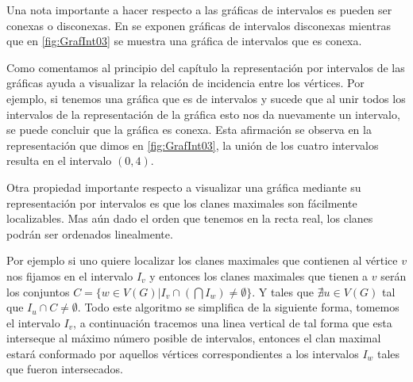 Una nota importante a hacer respecto a las gráficas de intervalos es pueden ser
conexas o disconexas. En  se exponen
gráficas de intervalos disconexas mientras que en \cref{fig:GrafInt03} se
muestra una gráfica de intervalos que es conexa. 

Como comentamos al principio del capítulo la representación por intervalos de
las gráficas ayuda a visualizar la relación de incidencia entre los vértices.
Por ejemplo, si tenemos una gráfica que es de intervalos y sucede que al unir
todos los intervalos de la representación de la gráfica esto nos da nuevamente
un intervalo, se puede concluir que la gráfica es conexa. Esta afirmación se
observa en la representación que dimos en \cref{fig:GrafInt03}, la unión de los
cuatro intervalos resulta en el intervalo $(0,4)$.

Otra propiedad importante respecto a visualizar una gráfica mediante su
representación por intervalos es que los clanes maximales son fácilmente
localizables. Mas aún dado el orden que tenemos en la recta real, los clanes
podrán ser ordenados linealmente.

Por ejemplo si uno quiere localizar los clanes maximales que contienen al
vértice $v$ nos fijamos en el intervalo $I_v$ y entonces los clanes maximales
que tienen a $v$ serán los conjuntos $C = \{w \in V(G)| I_v \cap (\bigcap I_w)
\neq \emptyset\}$. Y tales que $\nexists u \in V(G)$ tal que $I_u \cap C \neq
\emptyset$. Todo este algoritmo se simplifica de la siguiente forma, tomemos el
intervalo $I_v$, a continuación tracemos una linea vertical de tal forma que
esta interseque al máximo número posible de intervalos, entonces el clan maximal
estará conformado por aquellos vértices correspondientes a los intervalos $I_w$
tales que fueron intersecados.  

